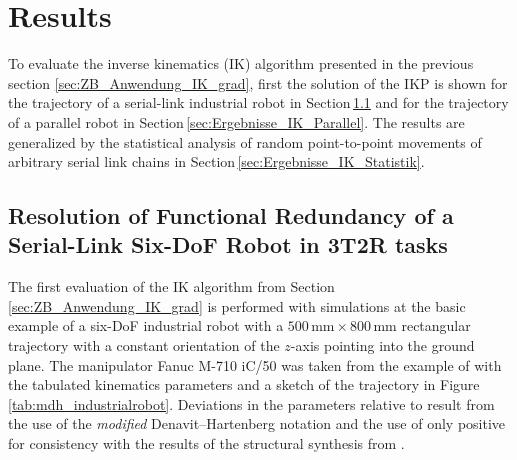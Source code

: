 \documentclass[robotics,article,accept,moreauthors,pdftex]{Definitions/mdpi}
\begin{document}
\section{Results}
\label{sec:Ergebnisse}

To evaluate the inverse kinematics (IK) algorithm presented in the previous section \ref{sec:ZB_Anwendung_IK_grad}, first the solution of the IKP is shown for the trajectory of a serial-link industrial robot in Section\,\ref{sec:Ergebnisse_Seriell} and for the trajectory of a parallel robot in Section\,\ref{sec:Ergebnisse_IK_Parallel}.
The results are generalized by the statistical analysis of random point-to-point movements of arbitrary serial link chains in Section\,\ref{sec:Ergebnisse_IK_Statistik}.

\subsection{Resolution of Functional Redundancy of a Serial-Link Six-DoF Robot in 3T2R tasks}
\label{sec:Ergebnisse_Seriell}


The first evaluation of the IK algorithm from Section\,\ref{sec:ZB_Anwendung_IK_grad} is performed with simulations at the basic example of a six-DoF industrial robot with a $500\,\mathrm{mm} \times 800\,\mathrm{mm}$ rectangular trajectory with a constant orientation of the $z$-axis pointing into the ground plane.
The manipulator Fanuc M-710 iC/50 was taken from the example of \cite{HuoBar2008} with the tabulated kinematics parameters and a sketch of the trajectory in Figure\,\ref{tab:mdh_industrialrobot}.
Deviations in the parameters relative to \cite{HuoBar2008} result from the use of the \emph{modified}  Denavit--Hartenberg notation  and the use of only positive   for consistency with the results of the structural synthesis from \cite{RamirezKotOrt2015}.
\end{document}

